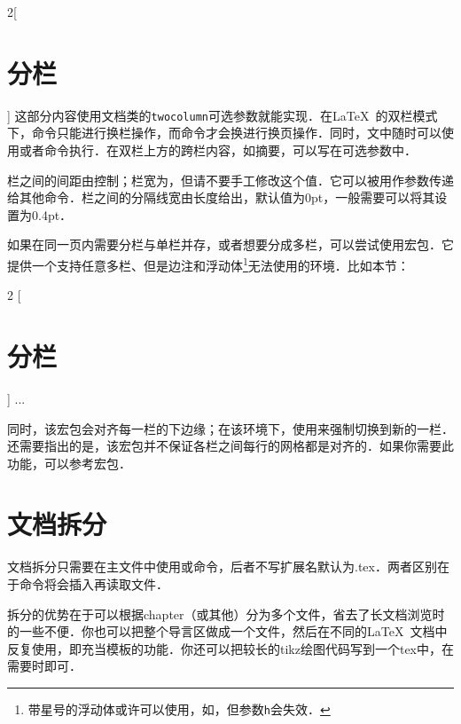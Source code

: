 \begin{multicols}{2}[\section{分栏}]
这部分内容使用文档类的\texttt{two\-column}可选参数就能实现．在\LaTeX\ 的双栏模式下，命令只能进行换栏操作，而命令才会换进行换页操作．同时，文中随时可以使用或者命令执行．在双栏上方的跨栏内容，如摘要，可以写在可选参数中．

栏之间的间距由控制；栏宽为，但请不要手工修改这个值．它可以被用作参数传递给其他命令．栏之间的分隔线宽由长度给出，默认值为0pt，一般需要可以将其设置为0.4pt． 

如果在同一页内需要分栏与单栏并存，或者想要分成多栏，可以尝试使用宏包．它提供一个支持任意多栏、但是边注和浮动体\footnote{带星号的浮动体或许可以使用，如，但参数\texttt{h}会失效．}无法使用的环境．比如本节：
\begin{latex}
\begin{multicols}{2}
  [\section{分栏}]
  ...
\end{multicols}
\end{latex}

同时，该宏包会对齐每一栏的下边缘；在该环境下，使用来强制切换到新的一栏．还需要指出的是，该宏包并不保证各栏之间每行的网格都是对齐的．如果你需要此功能，可以参考宏包．
\end{multicols}

\section{文档拆分}
\label{sec:include}
文档拆分只需要在主文件中使用或命令，后者不写扩展名默认为.tex．两者区别在于命令将会插入再读取文件．

拆分的优势在于可以根据chapter（或其他）分为多个文件，省去了长文档浏览时的一些不便．你也可以把整个导言区做成一个文件，然后在不同的\LaTeX\ 文档中反复使用，即充当模板的功能．你还可以把较长的tikz绘图代码写到一个tex中，在需要时即可．


